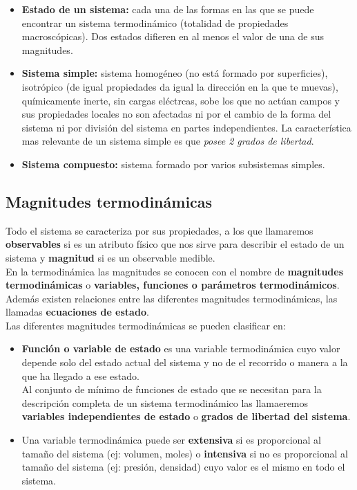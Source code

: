 \documentclass[12pt,a4paper]{article}
\begin{document}
\begin{itemize}
\item \textbf{Estado de un sistema:} cada una de las formas en las que se puede encontrar un sistema termodinámico (totalidad de propiedades macroscópicas). Dos estados difieren en al menos el valor de una de sus magnitudes.

\item \textbf{Sistema simple:}  sistema homogéneo (no está formado por superficies), isotrópico (de igual propiedades da igual la dirección en la que te muevas), químicamente inerte, sin cargas eléctrcas, sobe los que no actúan campos y sus propiedades locales no son afectadas ni por el cambio de la forma del sistema ni por división del sistema en partes independientes. La característica mas relevante de un sistema simple es que \emph{posee 2 grados de libertad}. 

\item \textbf{Sistema compuesto:} sistema formado por varios subsistemas simples.

\end{itemize}


\subsection{Magnitudes termodinámicas}
Todo el sistema se caracteriza por sus propiedades, a los que llamaremos \textbf{observables} si es un atributo físico que nos sirve para describir el estado de un sistema  y \textbf{magnitud} si es un observable medible. \\

En la termodinámica las magnitudes se conocen con el nombre de  \textbf{magnitudes termodinámicas} o \textbf{variables, funciones o parámetros termodinámicos}. Además existen relaciones entre las diferentes magnitudes termodinámicas, las llamadas \textbf{ecuaciones de estado}. \\

Las diferentes magnitudes termodinámicas se pueden clasificar en:\\

\begin{itemize}

\item \textbf{Función o variable de estado} es una variable termodinámica cuyo valor depende solo del estado actual del sistema y no de el recorrido o manera a la que ha llegado a ese estado. \\

Al conjunto de mínimo de  funciones de estado que se necesitan para la descripción completa de un sistema termodinámico las llamaeremos \textbf{variables independientes de estado}  o \textbf{grados de libertad del sistema}. 

\item Una variable termodinámica puede ser \textbf{extensiva} si es proporcional al tamaño del sistema (ej: volumen, moles) o \textbf{intensiva} si no es proporcional al tamaño del sistema (ej: presión, densidad) cuyo valor es el mismo en todo el sistema. \\

\end{itemize}
\end{document}
